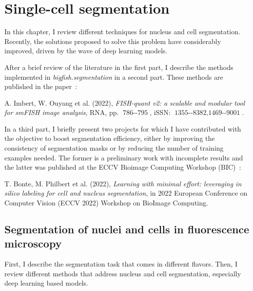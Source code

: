 
\graphicspath{{./figures/chapter3/}}

\chapter{Single-cell segmentation}
\label{ch:chapter3}

\minitoc
\newpage

In this chapter, I review different techniques for nucleus and cell segmentation.
Recently, the solutions proposed to solve this problem have considerably improved, driven by the wave of deep learning models.

After a brief review of the literature in the first part, I describe the methods implemented in \emph{bigfish.segmentation} in a second part.
These methods are published in the paper~\cite{Imbert_fq_2022}:

\begin{center}
	\color{green}
	A. Imbert, W. Ouyang et al. (2022), \textit{FISH-quant v2: a scalable and modular tool for smFISH image analysis}, RNA, pp. $\operatorname{786--795}$, iSSN: $\operatorname{1355--8382, 1469--9001}$.
\end{center}

In a third part, I briefly present two projects for which I have contributed with the objective to boost segmentation efficiency, either by improving the consistency of segmentation masks or by reducing the number of training examples needed.
The former is a preliminary work with incomplete results and the latter was published at the ECCV Bioimage Computing Workshop (BIC)~\cite{Bonte_2022}:

\begin{center}
	\color{green}
	T. Bonte, M. Philbert et al. (2022), \textit{Learning with minimal effort: leveraging in silico labeling for cell and nucleus segmentation}, in 2022 European Conference on Computer Vision (ECCV 2022) Workshop on BioImage Computing.
\end{center}

\section{Segmentation of nuclei and cells in fluorescence microscopy}
\label{sec:segmentation_introduction}

First, I describe the segmentation task that comes in different flavors.
Then, I review different methods that address nucleus and cell segmentation, especially deep learning based models.

